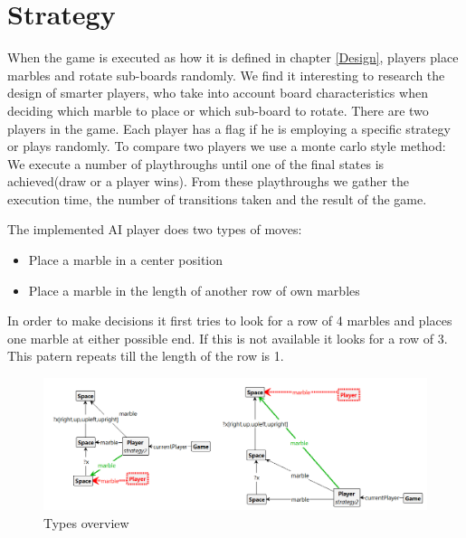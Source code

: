 \section{Strategy}
\label{Strategy}
When the game is executed as how it is defined in chapter \ref{Design}, players place marbles and rotate sub-boards randomly.
We find it interesting to research the design of smarter players, who take into account board characteristics when deciding which marble to place or which sub-board to rotate.
There are two players in the game. Each player has a flag if he is employing a specific strategy or plays randomly. 
To compare two players we use a monte carlo style method: We execute a number of playthroughs until one of the final states is achieved(draw or a player wins).
From these playthroughs we gather the execution time, the number of transitions taken and the result of the game.

\vspace{6pt}

The implemented AI player does two types of moves:
\begin{itemize}
\item Place a marble in a center position
\item Place a marble in the length of another row of own marbles
\end{itemize}

In order to make decisions it first tries to look for a row of 4 marbles and places one marble at either possible end. If this is not available it looks for a row of 3. This patern repeats till the length of the row is 1.

\begin{figure}[!h]
  \includegraphics[scale=0.5,clip]{Images/twocombined.png}
  \caption{Types overview}
  \label{fig:twocombined}
\end{figure}
